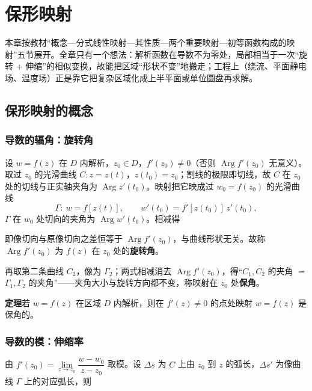 \chapter{保形映射}

本章按教材“概念—分式线性映射—其性质—两个重要映射—初等函数构成的映射”五节展开。全章只有一个想法：解析函数在导数不为零处，局部相当于一次“旋转 + 伸缩”的相似变换，故能把区域“形状不变”地搬走；工程上（绕流、平面静电场、温度场）正是靠它把复杂区域化成上半平面或单位圆盘再求解。

\section{保形映射的概念}

\subsection{导数的辐角：旋转角}

设 \(w=f(z)\) 在 \(D\) 内解析，\(z_{0}\in D\)，\(f'(z_{0})\neq0\)（否则 \(\operatorname{Arg}f'(z_{0})\) 无意义）。取过 \(z_{0}\) 的光滑曲线 \(C:z=z(t)\)，\(z(t_{0})=z_{0}\)；割线的极限即切线，故 \(C\) 在 \(z_{0}\) 处的切线与正实轴夹角为 \(\operatorname{Arg}z'(t_{0})\)。映射把它映成过 \(w_{0}=f(z_{0})\) 的光滑曲线
\[
\Gamma:\ w=f[z(t)],\qquad w'(t_{0})=f'[z(t_{0})]\,z'(t_{0}),
\]
\(\Gamma\) 在 \(w_{0}\) 处切向的夹角为 \(\operatorname{Arg}w'(t_{0})\)。相减得


即像切向与原像切向之差恒等于 \(\operatorname{Arg}f'(z_{0})\)，与曲线形状无关。故称 \(\operatorname{Arg}f'(z_{0})\) 为 \(f(z)\) 在 \(z_{0}\) 处的\textbf{旋转角}。

再取第二条曲线 \(C_{2}\)，像为 \(\Gamma_{2}\)；两式相减消去 \(\operatorname{Arg}f'(z_{0})\)，得“\(C_{1},C_{2}\) 的夹角 \(=\) \(\Gamma_{1},\Gamma_{2}\) 的夹角”——夹角大小与旋转方向都不变，称映射在 \(z_{0}\) 处\textbf{保角}。

\textbf{定理}\quad 若 \(w=f(z)\) 在区域 \(D\) 内解析，则在 \(f'(z)\neq0\) 的点处映射 \(w=f(z)\) 是保角的。

\subsection{导数的模：伸缩率}

由 \(f'(z_{0})=\lim\limits_{z\to z_{0}}\dfrac{w-w_{0}}{z-z_{0}}\) 取模。设 \(\Delta s\) 为 \(C\) 上由 \(z_{0}\) 到 \(z\) 的弧长，\(\Delta s'\) 为像曲线 \(\Gamma\) 上的对应弧长，则

